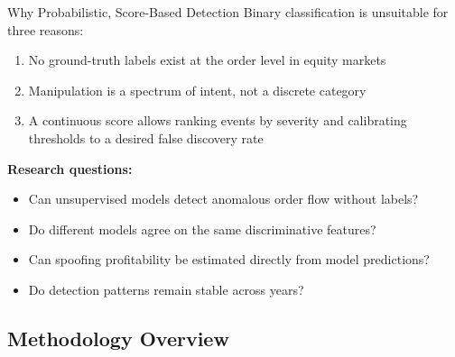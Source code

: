 \documentclass{beamer}
\begin{document}
\begin{frame}{Why Probabilistic, Score-Based Detection}
    Binary classification is unsuitable for three reasons:
    \begin{enumerate}
        \item No ground-truth labels exist at the order level in equity markets
        \item Manipulation is a spectrum of intent, not a discrete category
        \item A continuous score allows ranking events by severity and calibrating thresholds to a desired false discovery rate
    \end{enumerate}

    \vspace{0.3cm}
    \textbf{Research questions:}
    \begin{itemize}
        \item Can unsupervised models detect anomalous order flow without labels?
        \item Do different models agree on the same discriminative features?
        \item Can spoofing profitability be estimated directly from model predictions?
        \item Do detection patterns remain stable across years?
    \end{itemize}
\end{frame}


\subsection{Methodology Overview}
\end{document}
